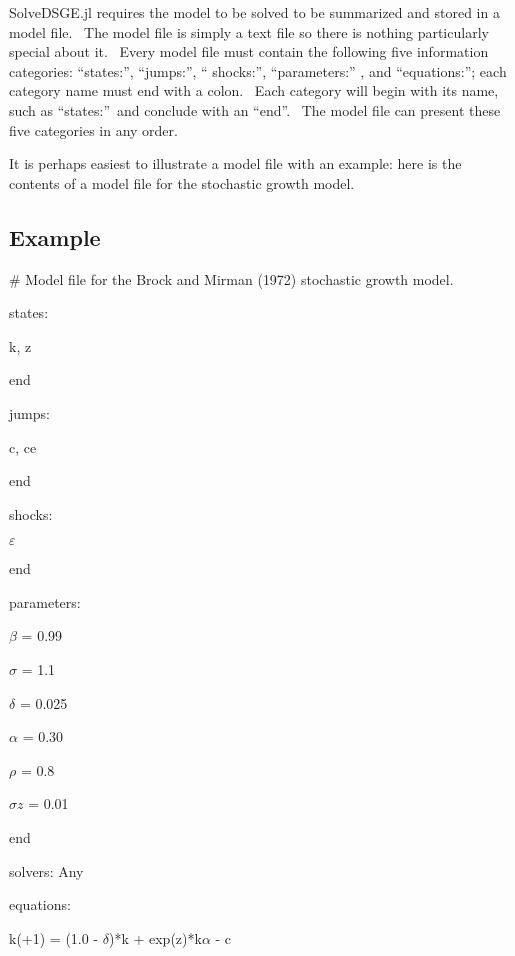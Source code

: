 \documentclass[notitlepage,11pt]{article}
\begin{document}
SolveDSGE.jl requires the model to be solved to be summarized and stored in
a model file. \ The model file is simply a text file so there is nothing
particularly special about it. \ Every model file must contain the following
five information categories: \textquotedblleft states:\textquotedblright ,
\textquotedblleft jumps:\textquotedblright , \textquotedblleft
shocks:\textquotedblright , \textquotedblleft parameters:\textquotedblright
, and \textquotedblleft equations:\textquotedblright ; each category name
must end with a colon. \ Each category will begin with its name, such as
\textquotedblleft states:\textquotedblright\ and conclude with an
\textquotedblleft end\textquotedblright . \ The model file can present these
five categories in any order.

It is perhaps easiest to illustrate a model file with an example: here is
the contents of a model file for the stochastic growth model.

\subsection{Example}

\# Model file for the Brock and Mirman (1972) stochastic growth model.

states:

k, z

end

\bigskip

jumps:

c, ce

end

\bigskip

shocks:

$\varepsilon $

end

\bigskip

parameters:

$\beta $ = 0.99

$\sigma $ = 1.1

$\delta $ = 0.025

$\alpha $ = 0.30

$\rho $ = 0.8

$\sigma z$ = 0.01

end

\bigskip

solvers: Any

\bigskip

equations:

k(+1) = (1.0 - $\delta $)*k + exp(z)*k$\alpha $ - c
\end{document}
